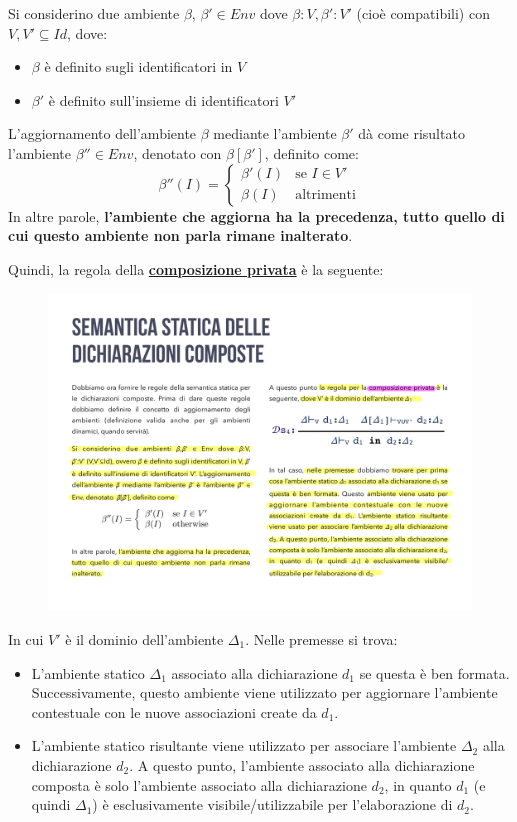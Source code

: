 \documentclass[a4paper]{article}
\begin{document}
	\noindent
	Si considerino due ambiente $\beta$, $\beta' \in Env$ dove $\beta : V, \beta' : V'$ (cioè compatibili) con $V,V' \subseteq Id$, dove:
	\begin{itemize}
		\item $\beta$ è definito sugli identificatori in $V$	
		\item $\beta'$ è definito sull'insieme di identificatori $V'$
	\end{itemize}
	L'aggiornamento dell'ambiente $\beta$ mediante l'ambiente $\beta'$ dà come risultato l'ambiente $\beta''\in Env$, denotato con $\beta\left[\beta'\right]$, definito come:
	\begin{equation*}
		\beta''\left(I\right) = \begin{cases}
			\beta'\left(I\right)	& \text{se } I \in V' \\
			\beta\left(I\right)		& \text{altrimenti}
		\end{cases}
	\end{equation*}
	In altre parole, \textbf{l'ambiente che aggiorna ha la precedenza, tutto quello di cui questo ambiente non parla rimane inalterato}.\newline
	
	\noindent
	Quindi, la regola della \textbf{\underline{composizione privata}} è la seguente:
	\begin{figure}[!htp]
		\centering
		\includegraphics[width=.6\textwidth]{img/semantica_statica_dichiarazioni-4.pdf}
	\end{figure}
	
	\noindent
	In cui $V'$ è il dominio dell'ambiente $\Delta_{1}$. Nelle premesse si trova:
	\begin{itemize}
		\item L'ambiente statico $\Delta_{1}$ associato alla dichiarazione $d_{1}$ se questa è ben formata. Successivamente, questo ambiente viene utilizzato per aggiornare l'ambiente contestuale con le nuove associazioni create da $d_{1}$.
		
		\item L'ambiente statico risultante viene utilizzato per associare l'ambiente $\Delta_{2}$ alla dichiarazione $d_{2}$. A questo punto, l'ambiente associato alla dichiarazione composta è solo l'ambiente associato alla dichiarazione $d_{2}$, in quanto $d_{1}$ (e quindi $\Delta_{1}$) è esclusivamente visibile/utilizzabile per l'elaborazione di $d_{2}$.
	\end{itemize}\newpage
\end{document}
